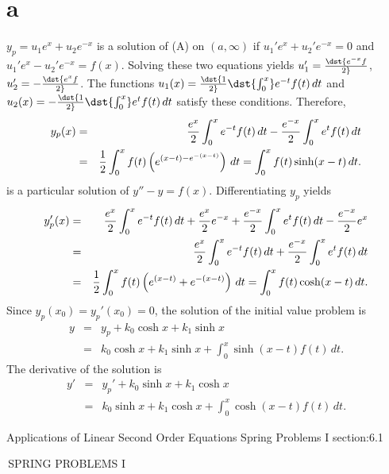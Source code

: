 \documentclass[dvips]{book}
\renewcommand{\exer}[1]{\par\medskip\;\noindent{\color{red}\bf #1.}}
\numberwithin{example}{section}
\numberwithin{equation}{section}
\numberwithin{theorem}{section}
\numberwithin{table}{section}
\numberwithin{figure}{section}
\begin{document}
\exer{5.7.38}
\setcounter{equation}{3}
\part{a} $y_p=u_1e^x+u_2e^{-x}$ is a solution of (A) on
$(a,\infty)$ if $u_1'e^x+u_2'e^{-x}=0$ and $u_1'e^x-u_2'e^{-x}
=f(x)$. Solving these two equations yields
$u_1'=\dst{e^{-x}f\over2}$,
$u_2'=-\dst{e^xf\over2}$. The functions
$u_1(x)=\dst{1\over2}\dst{\int_0^x}e^{-t}f(t)\,dt$
and $u_2(x)=-\dst{1\over2}\dst{\int_0^x}e^tf(t)\,dt$ satisfy
these conditions. Therefore,
\begin{eqnarray*}
y_p(x)&=&{e^x\over2}\int_0^xe^{-t}f(t)\,dt
-{e^{-x}\over2}\int_0^xe^tf(t)\,dt \\
&=&{1\over2}\int_0^xf(t)\left(e^{(x-t)-e^{-(x-t)}}\right)\,dt
=\int_0^x f(t)\sinh(x-t)\,dt.
\end{eqnarray*}
is a particular solution of $y''-y=f(x)$. Differentiating
$y_p$ yields
\begin{eqnarray*}
y_p'(x)&=&{e^x\over2}\int_0^xe^{-t}f(t)\,dt+{e^{x}\over2}e^{-x}
+{e^{-x}\over2}\int_0^xe^tf(t)\,dt-{e^{-x}\over2}e^x\\
&=&{e^x\over2}\int_0^xe^{-t}f(t)\,dt
+{e^{-x}\over2}\int_0^xe^tf(t)\,dt\\
&=&{1\over2}\int_0^xf(t)\left(e^{(x-t)}+e^{-(x-t)}\right)\,dt
=\int_0^x f(t)\cosh(x-t)\,dt.
\end{eqnarray*}
Since $y_p(x_0)=y_p'(x_0)=0$, the solution of the initial value
problem is
\begin{eqnarray*}
y&=&y_p+k_0\cosh x+k_1\sinh x\\
&=&k_0\cosh x+k_1\sinh x+\int_0^x\sinh (x-t)f(t)\,dt.
\end{eqnarray*}
The derivative of the solution is
\begin{eqnarray*}
y'&=&y_p'+k_0\sinh x+k_1\cosh x\\
&=&k_0\sinh x+k_1\cosh x+\int_0^x\cosh (x-t) f(t)\,dt.
\end{eqnarray*}


\newpage
\thispagestyle{empty}

\setcounter{chapter}{6}

 {Applications of Linear Second  Order Equations}
{Spring Problems I}
 {section:6.1}

\renewcommand{\thissection}{\sectiontitle
{\,SPRING PROBLEMS I}}
\thissection
\end{document}

